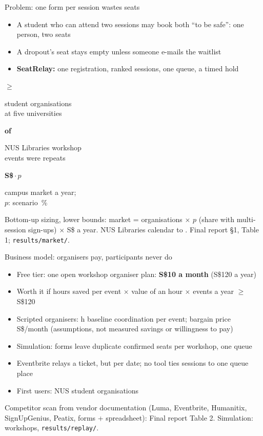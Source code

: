 \documentclass[t,20pt]{beamer}
\newcommand{\sd}{S\$}
\newcommand{\code}[1]{\texttt{#1}}
\newcommand{\hl}[1]{\textbf{\color{srBlue}#1}}
\newcommand{\source}[1]{\par\vfill{\fontsize{13}{15}\selectfont\color{srMuted}#1\par}\vspace{0.06in}}
\newcommand{\stat}[2]{\begin{minipage}[t]{3.85in}\raggedright%
    {\fontsize{40}{46}\selectfont\bfseries\color{srBlue}#1\par}\vspace{0.06in}#2\end{minipage}}
\begin{document}
\begin{frame}{Problem: one form per session wastes seats}
  \begin{itemize}
    \item A student who can attend two sessions may book both ``to be safe'': one person, two seats
    \item A dropout's seat stays empty unless someone e-mails the waitlist
    \item \hl{SeatRelay:} one registration, ranked sessions, one queue, a timed hold
  \end{itemize}
  \vspace{0.40in}
  \stat{$\geq$\,\MarketStudentOrgs}{student organisations\\at five universities}\hfill
  \stat{\MarketNusLibcalRepeatEvents{} of \MarketNusLibcalWorkshops}{NUS Libraries workshop\\events were repeats}\hfill
  \stat{\sd\MarketTamCampusSgd\,$\cdot\,p$}{campus market a year;\\$p$: scenario \SimMultiSessionPct\,\%}
  \source{Bottom-up sizing, lower bounds: market = organisations $\times$ $p$ (share with multi-session
    sign-ups) $\times$ \sd\MarketPriceSgd{} a year. NUS Libraries calendar \MarketLibcalFrom{} to
    \MarketLibcalTo. Final report \S1, Table 1; \code{results/market/}.}
\end{frame}

\begin{frame}{Business model: organisers pay, participants never do}
  \begin{itemize}
    \setlength{\itemsep}{0.42em}
    \item Free tier: one open workshop \textperiodcentered{} organiser plan: \hl{\sd10 a month} (\sd120 a year)
    \item Worth it if hours saved per event $\times$ value of an hour $\times$ events a year $\geq$ \sd120
    \item Scripted organisers: \SimCoordinationHours{} h baseline coordination per event; bargain price \sd\SimBargainSgd/month (assumptions, not measured savings or willingness to pay)
    \item Simulation: forms leave \hl{\ReplayDupConfirmedPerSessionMean} duplicate confirmed seats per workshop, one queue \ReplayDupConfirmedUnifiedMean
    \item Eventbrite relays a ticket, but per date; no tool ties sessions to one queue place
    \item First users: NUS student organisations
  \end{itemize}
  \source{Competitor scan from vendor documentation (Luma, Eventbrite, Humanitix, SignUpGenius,
    Peatix, forms + spreadsheet): Final report Table 2. Simulation: \ReplaySeeds{} workshops,
    \code{results/replay/}.}
\end{frame}
\end{document}
